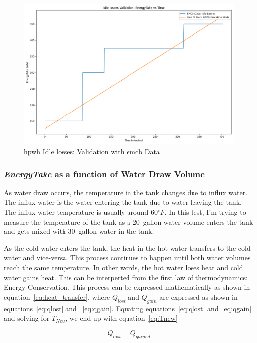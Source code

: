 \newpage
\begin{figure}[ht]
    \centering
    \includegraphics[width=0.9\columnwidth]{Pictures/idle_losses_val_validation.png}
    \caption{\gls{hpwh} Idle losses: Validation with \gls{emcb} Data}
    \label{fig:hpwh_idle_losses_val}
\end{figure}

\newpage
\subsubsection{\textit{EnergyTake} as a function of Water Draw Volume}

As water draw occurs, the temperature in the tank changes due to influx water. The influx water is the water entering the tank due to water leaving the tank. The influx water temperature is usually around 60${^\circ}F$. In this test, I'm trying to measure the temperature of the tank as a 20~gallon water volume enters the tank and gets mixed with 30~gallon water in the tank.

As the cold water enters the tank, the heat in the hot water transfers to the cold water and vice-versa. This process continues to happen until both water volumes reach the same temperature. In other words, the hot water loses heat and cold water gains heat. This can be interperted from the first law of thermodynamics: Energy Conservation. This process can be expressed mathematically as shown in equation~\ref{eq:heat_transfer}, where $Q_{lost}$ and $Q_{gain}$ are expressed as shown in equations~\ref{eq:qlost} and ~\ref{eq:qgain}. Equating equations~\ref{eq:qlost} and~\ref{eq:qgain} and solving for $T_{New}$, we end up with equation~\ref{eq:Tnew}

\begin{equation}\label{eq:heat_transfer}
    Q_{lost} = Q_{gained}
\end{equation}

